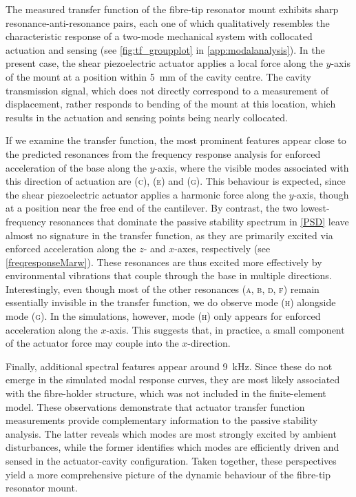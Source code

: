 \documentclass[../Thesis-IJspeert.tex]{subfiles}
\begin{document}
The measured transfer function of the fibre-tip resonator mount exhibits sharp resonance-anti-resonance pairs, each one of which qualitatively resembles the characteristic response of a two-mode mechanical system with collocated actuation and sensing (see \autoref{fig:tf_groupplot} in \autoref{app:modalanalysis}). In the present case, the shear piezoelectric actuator applies a local force along the $y$-axis of the mount at a position within \SI{5}{\milli\meter} of the cavity centre. The cavity transmission signal, which does not directly correspond to a measurement of displacement, rather responds to bending of the mount at this location, which results in the actuation and sensing points being nearly collocated.

If we examine the transfer function, the most prominent features appear close to the predicted resonances from the frequency response analysis for enforced acceleration of the base along the $y$-axis, where the visible modes associated with this direction of actuation are \textsc{(c)}, \textsc{(e)} and \textsc{(g)}. This behaviour is expected, since the shear piezoelectric actuator applies a harmonic force along the $y$-axis, though at a position near the free end of the cantilever. By contrast, the two lowest-frequency resonances that dominate the passive stability spectrum in \autoref{PSD} leave almost no signature in the transfer function, as they are primarily excited via enforced acceleration along the $z$- and $x$-axes, respectively (see \autoref{freqresponseMarw}). These resonances are thus excited more effectively by environmental vibrations that couple through the base in multiple directions. Interestingly, even though most of the other resonances \textsc{(a, b, d, f)} remain essentially invisible in the transfer function, we do observe mode \textsc{(h)} alongside mode \textsc{(g)}. In the simulations, however, mode \textsc{(h)} only appears for enforced acceleration along the $x$-axis. This suggests that, in practice, a small component of the actuator force may couple into the $x$-direction.

Finally, additional spectral features appear around \SI{9}{\kilo\hertz}. Since these do not emerge in the simulated modal response curves, they are most likely associated with the fibre-holder structure, which was not included in the finite-element model. These observations demonstrate that actuator transfer function measurements provide complementary information to the passive stability analysis. The latter reveals which modes are most strongly excited by ambient disturbances, while the former identifies which modes are efficiently driven and sensed in the actuator-cavity configuration. Taken together, these perspectives yield a more comprehensive picture of the dynamic behaviour of the fibre-tip resonator mount.
\end{document}
